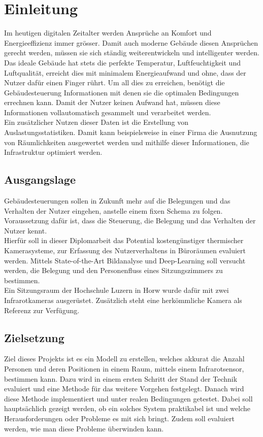\chapter{Einleitung}

Im heutigen digitalen Zeitalter werden Ansprüche an Komfort und Energieeffizienz immer grösser. Damit auch moderne Gebäude diesen Ansprüchen gerecht werden, müssen sie sich ständig weiterentwickeln und intelligenter werden.\\
Das ideale Gebäude hat stets die perfekte Temperatur, Luftfeuchtigkeit und Luftqualität, erreicht dies mit minimalem Energieaufwand und ohne, dass der Nutzer dafür einen Finger rührt. Um all dies zu erreichen, benötigt die Gebäudesteuerung Informationen mit denen sie die optimalen Bedingungen errechnen kann. Damit der Nutzer keinen Aufwand hat, müssen diese Informationen vollautomatisch gesammelt und verarbeitet werden.\\
Ein zusätzlicher Nutzen dieser Daten ist die Erstellung von Auslastungsstatistiken. Damit kann beispielsweise in einer Firma die Ausnutzung von Räumlichkeiten ausgewertet werden und mithilfe dieser Informationen, die Infrastruktur optimiert werden.

\section{Ausgangslage}
\label{sec:Ausgangslage}

Gebäudesteuerungen sollen in Zukunft mehr auf die Belegungen und das Verhalten der Nutzer eingehen, anstelle einem fixen Schema zu folgen. Voraussetzung dafür ist, dass die Steuerung, die Belegung und das Verhalten der Nutzer kennt.\\
Hierfür soll in dieser Diplomarbeit das Potential kostengünstiger thermischer Kamerasysteme, zur Erfassung des Nutzerverhaltens in Büroräumen evaluiert werden. Mittels State-of-the-Art Bildanalyse und Deep-Learning soll versucht werden, die Belegung und den Personenfluss eines Sitzungszimmers zu bestimmen.\\
Ein Sitzungsraum der Hochschule Luzern in Horw wurde dafür mit zwei Infrarotkameras ausgerüstet. Zusätzlich steht eine herkömmliche Kamera als Referenz zur Verfügung.


\section{Zielsetzung}
\label{sec:Zielsetzung}

Ziel dieses Projekts ist es ein Modell zu erstellen, welches akkurat die Anzahl Personen und deren Positionen in einem Raum, mittels einem Infrarotsensor, bestimmen kann. Dazu wird in einem ersten Schritt der Stand der Technik evaluiert und eine Methode für das weitere Vorgehen festgelegt. Danach wird diese Methode implementiert und unter realen Bedingungen getestet. Dabei soll hauptsächlich gezeigt werden, ob ein solches System praktikabel ist und welche Herausforderungen oder Probleme es mit sich bringt. Zudem soll evaluiert werden, wie man diese Probleme überwinden kann.

